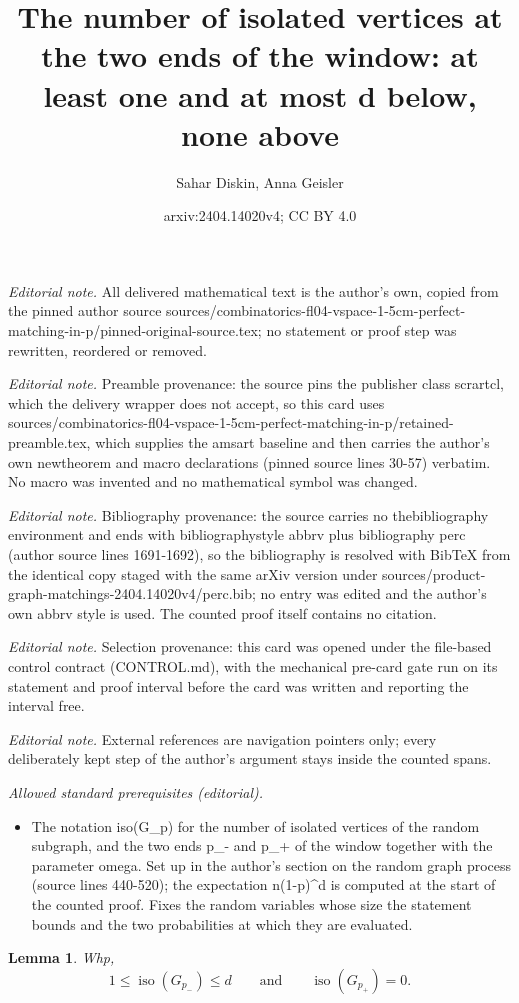 \documentclass[10pt,a4paper]{amsart}
\title{The number of isolated vertices at the two ends of the window: at least one and at most d below, none above}
\author{Sahar Diskin, Anna Geisler}
\date{arxiv:2404.14020v4; CC BY 4.0}
\newtheorem{lemma}[thm]{Lemma}
\newcommand{\iso}{\operatorname{iso}}
\begin{document}
\maketitle
\noindent\textit{Editorial note.} All delivered mathematical text is the author's own, copied from the pinned author source sources/combinatorics-fl04-vspace-1-5cm-perfect-matching-in-p/pinned-original-source.tex; no statement or proof step was rewritten, reordered or removed.\par\medskip
\noindent\textit{Editorial note.} Preamble provenance: the source pins the publisher class scrartcl, which the delivery wrapper does not accept, so this card uses sources/combinatorics-fl04-vspace-1-5cm-perfect-matching-in-p/retained-preamble.tex, which supplies the amsart baseline and then carries the author's own newtheorem and macro declarations (pinned source lines 30-57) verbatim. No macro was invented and no mathematical symbol was changed.\par\medskip
\noindent\textit{Editorial note.} Bibliography provenance: the source carries no thebibliography environment and ends with bibliographystyle abbrv plus bibliography perc (author source lines 1691-1692), so the bibliography is resolved with BibTeX from the identical copy staged with the same arXiv version under sources/product-graph-matchings-2404.14020v4/perc.bib; no entry was edited and the author's own abbrv style is used. The counted proof itself contains no citation.\par\medskip
\noindent\textit{Editorial note.} Selection provenance: this card was opened under the file-based control contract (CONTROL.md), with the mechanical pre-card gate run on its statement and proof interval before the card was written and reporting the interval free.\par\medskip
\noindent\textit{Editorial note.} External references are navigation pointers only; every deliberately kept step of the author's argument stays inside the counted spans.\par\medskip
\noindent\textit{Allowed standard prerequisites (editorial).}\begin{itemize}
\item The notation iso(G\_p) for the number of isolated vertices of the random subgraph, and the two ends p\_- and p\_+ of the window together with the parameter omega. Set up in the author's section on the random graph process (source lines 440-520); the expectation n(1-p)\textasciicircum{}d is computed at the start of the counted proof. Fixes the random variables whose size the statement bounds and the two probabilities at which they are evaluated.
\end{itemize}\medskip
\begin{lemma}\label{lem:number-isolates}
Whp,
\[
  1\le \iso(G_{p_-})\le d
  \qquad\text{and}\qquad
  \iso(G_{p_+})=0.
\]
\end{lemma}
\end{document}
